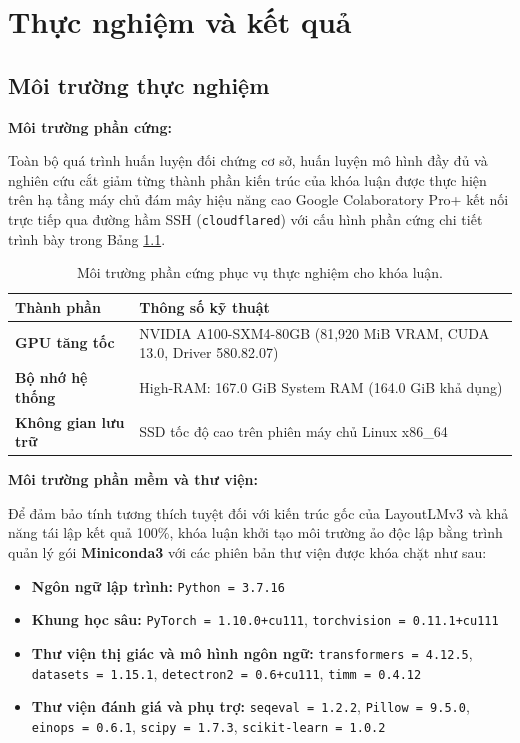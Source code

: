 \chapter{Thực nghiệm và kết quả}
\section{Môi trường thực nghiệm}
\textbf{Môi trường phần cứng:}

Toàn bộ quá trình huấn luyện đối chứng cơ sở, huấn luyện mô hình đầy đủ và nghiên cứu cắt giảm từng thành phần kiến trúc của khóa luận được thực hiện trên hạ tầng máy chủ đám mây hiệu năng cao Google Colaboratory Pro+ kết nối trực tiếp qua đường hầm SSH (\texttt{cloudflared}) với cấu hình phần cứng chi tiết trình bày trong Bảng \ref{tab:hardware_env}.

\begin{table}[H]
\centering
\small
\renewcommand{\arraystretch}{1.2}
\begin{tabularx}{\textwidth}{|>{\bfseries}p{3.8cm}|X|}
\hline
Thành phần & Thông số kỹ thuật \\ \hline
GPU tăng tốc        & NVIDIA A100-SXM4-80GB (81,920 MiB VRAM, CUDA 13.0, Driver 580.82.07) \\ \hline
Bộ nhớ hệ thống     & High-RAM: 167.0 GiB System RAM (164.0 GiB khả dụng) \\ \hline
Không gian lưu trữ  & SSD tốc độ cao trên phiên máy chủ Linux x86\_64 \\ \hline
\end{tabularx}
\caption{Môi trường phần cứng phục vụ thực nghiệm cho khóa luận.}
\label{tab:hardware_env}
\end{table}\leavevmode

\textbf{Môi trường phần mềm và thư viện:}

Để đảm bảo tính tương thích tuyệt đối với kiến trúc gốc của LayoutLMv3 \cite{huang2022layoutlmv3} và khả năng tái lập kết quả 100\%, khóa luận khởi tạo môi trường ảo độc lập bằng trình quản lý gói \textbf{Miniconda3} với các phiên bản thư viện được khóa chặt như sau:
\begin{itemize}
    \item \textbf{Ngôn ngữ lập trình:} \texttt{Python = 3.7.16}
    \item \textbf{Khung học sâu:} \texttt{PyTorch = 1.10.0+cu111}, \texttt{torchvision = 0.11.1+cu111}
    \item \textbf{Thư viện thị giác và mô hình ngôn ngữ:} \texttt{transformers = 4.12.5}, \texttt{datasets = 1.15.1}, \texttt{detectron2 = 0.6+cu111}, \texttt{timm = 0.4.12}
    \item \textbf{Thư viện đánh giá và phụ trợ:} \texttt{seqeval = 1.2.2}, \texttt{Pillow = 9.5.0}, \texttt{einops = 0.6.1}, \texttt{scipy = 1.7.3}, \texttt{scikit-learn = 1.0.2}
\end{itemize}

